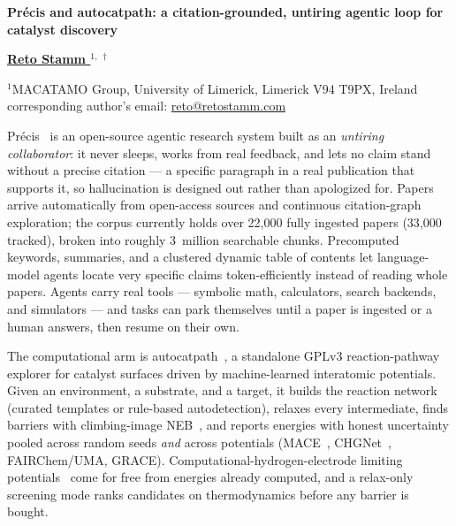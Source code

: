 \documentclass[11pt]{article}
\newcommand{\abstracttitle}[1]{
\setstretch{1.15}    %
 \begin{center}{\Large {\bf #1}}\end{center}
\setstretch{1.0}
}
\newcommand{\authors}[1]{
 \begin{center}{\bf #1} \end{center}
 \setstretch{1.0}
}
\newcommand{\addresses}[1]{
\setstretch{0.95}
 \begin{center}{\small #1} \end{center}
\setstretch{1}
}
\begin{document}
\abstracttitle{Pr\'ecis and autocatpath: a citation-grounded, untiring agentic loop for catalyst discovery}
\authors{
\underline{Reto Stamm $^{1,~\dag}$}
}

\addresses{%
$^{1}$MACATAMO Group, University of Limerick, Limerick V94 T9PX, Ireland \\
\dag corresponding author's email: \href{mailto:reto@retostamm.com}{reto@retostamm.com}
}

Pr\'ecis~\cite{Stamm2026precis} is an open-source agentic research system
built as an \emph{untiring collaborator}: it never sleeps, works from real
feedback, and lets no claim stand without a precise citation --- a specific
paragraph in a real publication that supports it, so hallucination is
designed out rather than apologized for. Papers arrive automatically from
open-access sources and continuous citation-graph exploration; the corpus
currently holds over 22{,}000 fully ingested papers (33{,}000 tracked),
broken into roughly 3~million searchable chunks. Precomputed keywords,
summaries, and a clustered dynamic table of contents let language-model
agents locate very specific claims token-efficiently instead of reading
whole papers. Agents carry real tools --- symbolic math, calculators,
search backends, and simulators --- and tasks can park themselves until a
paper is ingested or a human answers, then resume on their own.

The computational arm is autocatpath~\cite{Stamm2026catpath}, a standalone
GPLv3 reaction-pathway explorer for catalyst surfaces driven by machine-learned
interatomic potentials. Given an environment, a substrate, and a target, it
builds the reaction network (curated templates or rule-based autodetection),
relaxes every intermediate, finds barriers with climbing-image
NEB~\cite{Henkelman2000}, and reports energies with honest uncertainty pooled
across random seeds \emph{and} across potentials (MACE~\cite{Batatia2022},
CHGNet~\cite{Deng2023}, FAIRChem/UMA, GRACE). Computational-hydrogen-electrode
limiting potentials~\cite{Norskov2004} come for free from energies already
computed, and a relax-only screening mode ranks candidates on thermodynamics
before any barrier is bought.
\end{document}
